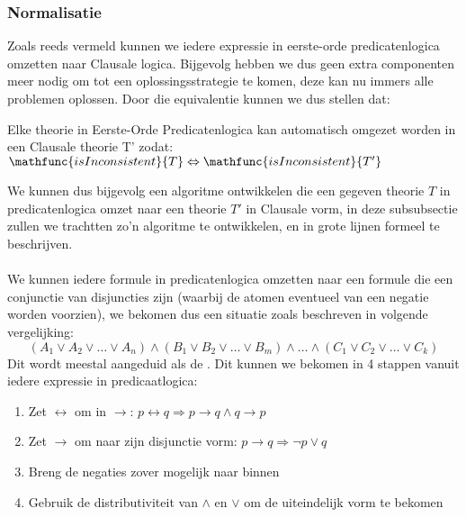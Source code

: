 \subsubsection{Normalisatie}
\label{sss:normalisation}
Zoals reeds vermeld kunnen we iedere expressie in eerste-orde predicatenlogica omzetten naar Clausale logica. Bijgevolg hebben we dus geen extra componenten meer nodig om tot een oplossingsstrategie te komen, deze kan nu immers alle problemen oplossen. Door die equivalentie kunnen we dus stellen dat:
\begin{theorem}
Elke theorie in Eerste-Orde Predicatenlogica kan automatisch omgezet worden in een Clausale theorie T' zodat: $\mathfunc{isInconsistent}{T}\Leftrightarrow\mathfunc{isInconsistent}{T'}$
\end{theorem}
We kunnen dus bijgevolg een algoritme ontwikkelen die een gegeven theorie $T$ in predicatenlogica omzet naar een theorie $T'$ in Clausale vorm, in deze subsubsectie zullen we trachtten zo'n algoritme te ontwikkelen, en in grote lijnen formeel te beschrijven.
\paragraph{}We kunnen iedere formule in predicatenlogica omzetten naar een formule die een conjunctie van disjuncties zijn (waarbij de atomen eventueel van een negatie worden voorzien), we bekomen dus een situatie zoals beschreven in volgende vergelijking:
\begin{equation}
\left(A_1\vee A_2\vee\ldots\vee A_n\right)\wedge\left(B_1\vee B_2\vee\ldots\vee B_m\right)\wedge\ldots\wedge\left(C_1\vee C_2\vee\ldots\vee C_k\right)
\end{equation}
Dit wordt meestal aangeduid als de . Dit kunnen we bekomen in 4 stappen vanuit iedere expressie in predicaatlogica:
\begin{enumerate}
 \item Zet $\leftrightarrow$ om in $\rightarrow$: $p\leftrightarrow q\Rightarrow p\rightarrow q\wedge q\rightarrow p$
 \item Zet $\rightarrow$ om naar zijn disjunctie vorm: $p\rightarrow q\Rightarrow \neg p\vee q$
 \item Breng de negaties zover mogelijk naar binnen
 \item Gebruik de distributiviteit van $\wedge$ en $\vee$ om de uiteindelijk vorm te bekomen
\end{enumerate}
